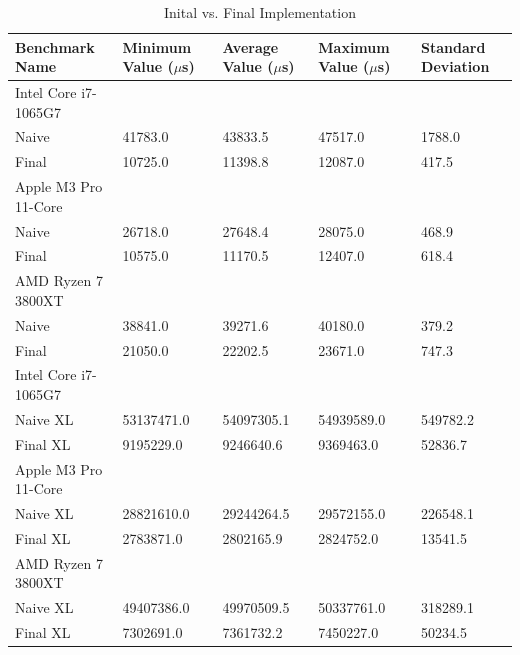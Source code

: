 \documentclass[modern,longauthor]{aastex7}
\begin{document}
\begin{table}[htb!]
\centering
\caption{Inital vs. Final Implementation\label{tab:initial_vs_final}}
\begin{tabular}{p{5cm} p{2cm} p{2cm} p{2cm} p{2cm}}
\hline
Benchmark Name & Minimum Value ($\mu$s) & Average Value ($\mu$s) & Maximum Value ($\mu$s) & Standard Deviation \\
\hline
Intel Core i7-1065G7 \\
\hspace{0.5cm}Naive & 41783.0 & 43833.5 & 47517.0 & 1788.0 \\
\hspace{0.5cm}Final & 10725.0 & 11398.8 & 12087.0 & 417.5 \\
Apple M3 Pro 11-Core \\
\hspace{0.5cm}Naive & 26718.0 & 27648.4 & 28075.0 & 468.9 \\
\hspace{0.5cm}Final & 10575.0 & 11170.5 & 12407.0 & 618.4 \\
AMD Ryzen 7 3800XT \\
\hspace{0.5cm}Naive & 38841.0 & 39271.6 & 40180.0 & 379.2 \\
\hspace{0.5cm}Final & 21050.0 & 22202.5 & 23671.0 & 747.3 \\
\hline
Intel Core i7-1065G7 \\
\hspace{0.5cm}Naive XL & 53137471.0 & 54097305.1 & 54939589.0 & 549782.2 \\
\hspace{0.5cm}Final XL & 9195229.0 & 9246640.6 & 9369463.0 & 52836.7 \\
Apple M3 Pro 11-Core \\
\hspace{0.5cm}Naive XL & 28821610.0 & 29244264.5 & 29572155.0 & 226548.1 \\
\hspace{0.5cm}Final XL & 2783871.0 & 2802165.9 & 2824752.0 & 13541.5 \\
AMD Ryzen 7 3800XT \\
\hspace{0.5cm}Naive XL & 49407386.0 & 49970509.5 & 50337761.0 & 318289.1 \\
\hspace{0.5cm}Final XL & 7302691.0 & 7361732.2 & 7450227.0 & 50234.5 \\
\hline
\end{tabular}
\end{table}
\FloatBarrier
\end{document}
